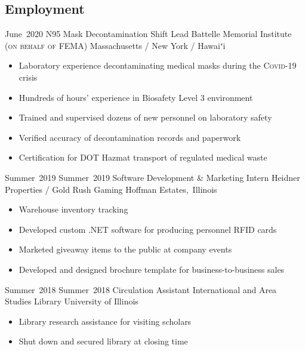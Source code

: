 \subsection*{Employment}
\secitemexperience
	{June~2020}
	{}
	{N95 Mask Decontamination Shift Lead}
	{Battelle Memorial Institute {\scshape\footnotesize (on behalf of FEMA)}}
    {Massachusetts / New York / Hawaiʻi}
	{
		\begin{itemize}
			\vspace{-2mm}
			\item Laboratory experience decontaminating medical masks during the {\scshape Covid-19} crisis
			\item Hundreds of hours' experience in Biosafety Level 3 environment
			\item Trained and supervised dozens of new personnel on laboratory safety
			\item Verified accuracy of decontamination records and paperwork
			\item Certification for DOT Hazmat transport of regulated medical waste
			\vspace{-2mm}
		\end{itemize}
	}
\secitemexperience
	{Summer~2019}
	{Summer~2019}
	{Software Development \& Marketing Intern}
	{Heidner Properties / Gold Rush Gaming}
	{Hoffman Estates,~Illinois}
	{
		\begin{itemize}
			\vspace{-2mm}
			\item Warehouse inventory tracking
			\item Developed custom .NET software for producing personnel RFID cards
			\item Marketed giveaway items to the public at company events
			\item Developed and designed brochure template for business-to-business sales
			\vspace{-2mm}
		\end{itemize}
	}
\secitemexperience
	{Summer~2018}
	{Summer~2018}
	{Circulation Assistant}
	{International and Area Studies Library}
	{University of Illinois}
	{
		\begin{itemize}
			\vspace{-2mm}
			\item Library research assistance for visiting scholars
			\item Shut down and secured library at closing time
			\vspace{-2mm}
		\end{itemize}
	}
